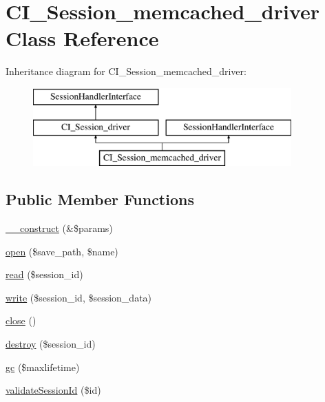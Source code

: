 \hypertarget{class_c_i___session__memcached__driver}{}\section{C\+I\+\_\+\+Session\+\_\+memcached\+\_\+driver Class Reference}
\label{class_c_i___session__memcached__driver}
Inheritance diagram for C\+I\+\_\+\+Session\+\_\+memcached\+\_\+driver\+:\begin{figure}[H]
\begin{center}
\leavevmode
\includegraphics[height=3.000000cm]{class_c_i___session__memcached__driver}
\end{center}
\end{figure}
\subsection*{Public Member Functions}
\begin{DoxyCompactItemize}
\item 
\mbox{\hyperlink{class_c_i___session__memcached__driver_ab04d7ead65aa8da9b2258c715574b8d9}{\+\_\+\+\_\+construct}} (\&\$params)
\item 
\mbox{\hyperlink{class_c_i___session__memcached__driver_adb9377b12dcb93b72ef4ac914a3b7fb0}{open}} (\$save\+\_\+path, \$name)
\item 
\mbox{\hyperlink{class_c_i___session__memcached__driver_a92ebbaa0db2c8daa6a15891afefd4e91}{read}} (\$session\+\_\+id)
\item 
\mbox{\hyperlink{class_c_i___session__memcached__driver_a40d08f4aadd7856aae82bbc04e400962}{write}} (\$session\+\_\+id, \$session\+\_\+data)
\item 
\mbox{\hyperlink{class_c_i___session__memcached__driver_ad674ff1dedbad8860d4b16c0312dbd95}{close}} ()
\item 
\mbox{\hyperlink{class_c_i___session__memcached__driver_ae640c7d88fe88e790e97482e5912af93}{destroy}} (\$session\+\_\+id)
\item 
\mbox{\hyperlink{class_c_i___session__memcached__driver_a9f1a589deb45162bf31e84159f9949d8}{gc}} (\$maxlifetime)
\item 
\mbox{\hyperlink{class_c_i___session__memcached__driver_a52cdd6ca28cd5ed1eb0c8e7b1eee4af6}{validate\+Session\+Id}} (\$id)
\end{DoxyCompactItemize}

